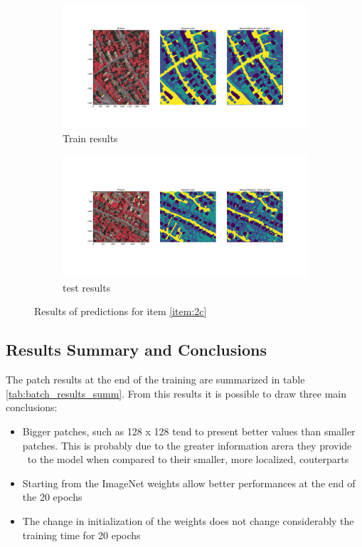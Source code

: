\documentclass[10pt, a4paper]{article}
\begin{document}
\begin{figure}[htpb]
  \centering
  \begin{subfigure}[b]{0.45\textwidth}
      \centering
      \includegraphics[width=\textwidth]{images/Patch128_scratch_train.pdf}
      \caption{Train results}
      \label{fig:q2c_train}
  \end{subfigure}
  \hspace{0.05\textwidth}
  \begin{subfigure}[b]{0.45\textwidth}
    \centering
    \includegraphics[width=\textwidth]{images/Patch128_scratch_test.pdf}
    \caption{test results}
    \label{fig:q2c_test}
  \end{subfigure}
  \caption{Results of predictions for item \ref{item:2c}}
  \label{fig:q2c_results}
\end{figure}

\subsection{Results Summary and Conclusions}

The patch results at the end of the training are summarized in table \ref{tab:batch_results_summ}. From this results it is possible to draw three main conclusions:
\begin{itemize}
  \item Bigger patches, such as 128 x 128 tend to present better values than smaller patches. This is probably due to the greater information arera they provide \
    to the model when compared to their smaller, more localized, couterparts
  \item Starting from the ImageNet weights allow better performances at the end of the 20 epochs
  \item The change in initialization of the weights does not change considerably the training time for 20 epochs
\end{itemize}
\end{document}
